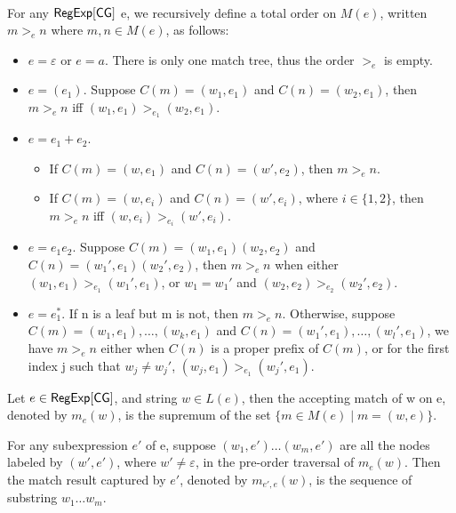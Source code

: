   \begin{definition}
  	\
  	
  	For any ${\sf RegExp}[\sf CG]$ e, we recursively define a total order on $M (e)$, written $m
  	>_e n$ where $m, n \in M (e)$, as follows:
  	\begin{itemize}
  		\item $e = \varepsilon$ or $e = a$. There is only one match tree, thus the
  		order $>_e$ is empty.
  		
  		\item $e = (e_1)$. Suppose $C (m) = (w_1, e_1)$ and $C (n) = (w_2, e_1)$,
  		then $m >_e n$ iff $(w_1, e_1) >_{e_1} (w_2, e_1)$.
  		
  		\item $e = e_1 + e_2$.
  		\begin{itemize}
  			\item If $C (m) = (w, e_1)$ and $C (n) = (w', e_2)$, then $m >_e n$.
  			
  			\item If $C (m) = (w, e_i)$ and $C (n) = (w', e_i)$, where $i \in \{ 1,
  			2 \}$, then $m >_e n$ iff $(w, e_i) >_{e_i} (w', e_i)$.
  		\end{itemize}
  		\item $e = e_1 e_2$. Suppose $C (m) = (w_1, e_1) (w_2, e_2)$ and $C (n) =
  		(w_1', e_1) (w_2', e_2)$, then $m >_e n$ when either $(w_1, e_1) >_{e_1}
  		(w_1', e_1)$, or $w_1 = w_1'$ and $(w_2, e_2) >_{e_2} (w_2', e_2)$.
  		
  		\item $e = e_1^{\ast}$. If n is a leaf but m is not, then $m >_e n$.
  		Otherwise, suppose $C (m) = (w_1, e_1), \ldots, (w_k, e_1)$ and $C (n) =
  		(w_1', e_1), \ldots, (w_l', e_1)$, we have $m >_e n$ either when $C (n)$
  		is a proper prefix of $C (m)$, or for the first index j such that $w_j
  		\neq w_j'$, $(w_j, e_1) >_{e_1} (w_j', e_1)$.
  	\end{itemize}
  	
  	Let $e \in {\sf RegExp}[\sf CG]$, and string $w \in L (e)$, then the accepting match of w
  	on e, denoted by $m_e (w)$, is the supremum of the set $\{ m \in M (e) \mid m = (w, e) \}$.
  	
  	For any subexpression $e'$ of e, suppose $(w_1, e') \ldots (w_m, e')$ are
  	all the nodes labeled by $(w', e')$, where $w' \neq \varepsilon$, in the
  	pre-order traversal of $m_e (w)$. Then the match result captured by $e'$, denoted
  	by $m_{e', e} (w)$, is the sequence of substring $w_1 \ldots w_m$.
  \end{definition}
  
